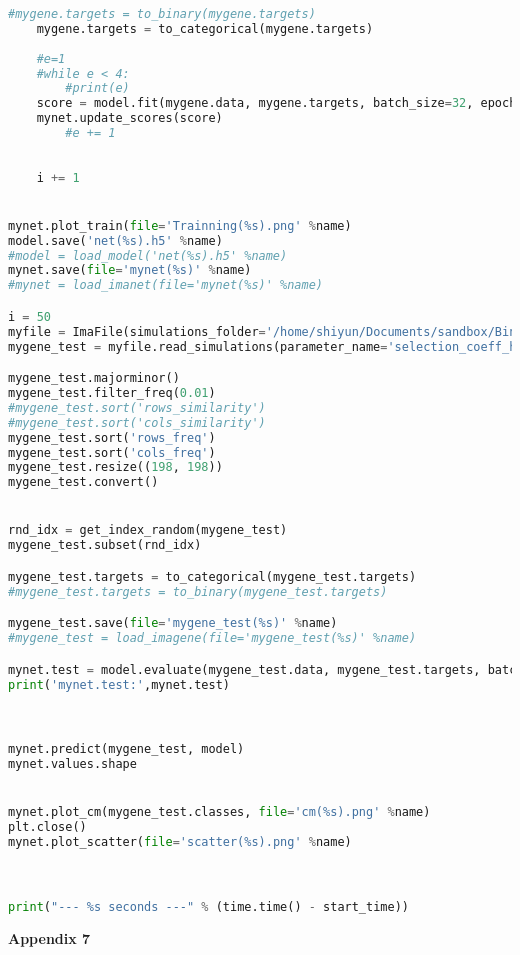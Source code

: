 \begin{lstlisting}[language=Python,breaklines]
    #mygene.targets = to_binary(mygene.targets)
    mygene.targets = to_categorical(mygene.targets)
    
    #e=1
    #while e < 4:
        #print(e)
    score = model.fit(mygene.data, mygene.targets, batch_size=32, epochs=1, verbose=1, validation_split=0.10)
    mynet.update_scores(score)
        #e += 1
    
    
    i += 1


mynet.plot_train(file='Trainning(%s).png' %name)
model.save('net(%s).h5' %name)
#model = load_model('net(%s).h5' %name)
mynet.save(file='mynet(%s)' %name)
#mynet = load_imanet(file='mynet(%s)' %name)

i = 50
myfile = ImaFile(simulations_folder='/home/shiyun/Documents/sandbox/Binary3/Simulations' + str(i) + '.Epoch3', nr_samples=198, model_name='3epoch-CEU')
mygene_test = myfile.read_simulations(parameter_name='selection_coeff_hetero', max_nrepl=2000)

mygene_test.majorminor()
mygene_test.filter_freq(0.01)
#mygene_test.sort('rows_similarity')
#mygene_test.sort('cols_similarity')
mygene_test.sort('rows_freq')
mygene_test.sort('cols_freq')
mygene_test.resize((198, 198))
mygene_test.convert()


rnd_idx = get_index_random(mygene_test)
mygene_test.subset(rnd_idx)

mygene_test.targets = to_categorical(mygene_test.targets)
#mygene_test.targets = to_binary(mygene_test.targets)

mygene_test.save(file='mygene_test(%s)' %name)
#mygene_test = load_imagene(file='mygene_test(%s)' %name)

mynet.test = model.evaluate(mygene_test.data, mygene_test.targets, batch_size=None, verbose=0)
print('mynet.test:',mynet.test)



mynet.predict(mygene_test, model)
mynet.values.shape


mynet.plot_cm(mygene_test.classes, file='cm(%s).png' %name)
plt.close()
mynet.plot_scatter(file='scatter(%s).png' %name)



print("--- %s seconds ---" % (time.time() - start_time))
\end{lstlisting}






\cleardoublepage\clearpage
\large \vspace{1cm}
{\bf Appendix 7} 
\small 

